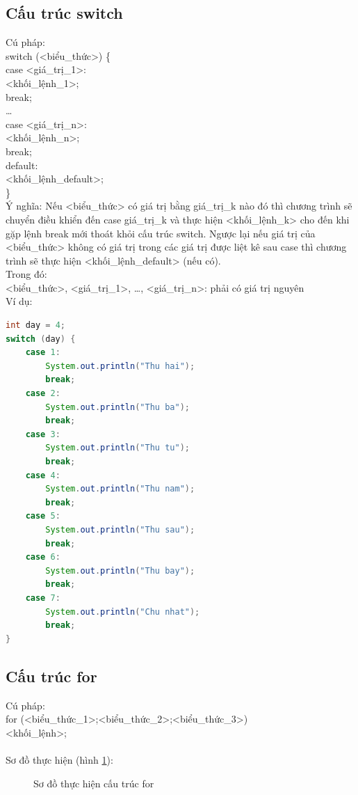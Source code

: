 \subsection{Cấu trúc switch}
\indent Cú pháp:\\
{\ttfamily
switch (<biểu\_thức>) \{\\
\indent case <giá\_trị\_1>:\\
\indent \indent <khối\_lệnh\_1>;\\
\indent \indent break;\\
\indent \indent …\\
\indent case <giá\_trị\_n>:\\
\indent \indent <khối\_lệnh\_n>;\\
\indent \indent break;\\
\indent default:\\
\indent \indent <khối\_lệnh\_default>;\\
\}}\\
\indent Ý nghĩa: Nếu {\ttfamily <biểu\_thức>} có giá trị bằng {\ttfamily giá\_trị\_k} nào đó thì chương trình sẽ chuyển điều khiển đến {\ttfamily case giá\_trị\_k} và thực hiện {\ttfamily <khối\_lệnh\_k>} cho đến khi gặp lệnh {\ttfamily break} mới thoát khỏi cấu trúc {\ttfamily switch}. Ngược lại nếu giá trị của {\ttfamily <biểu\_thức>} không có giá trị trong các giá trị được liệt kê sau {\ttfamily case} thì chương trình sẽ thực hiện {\ttfamily <khối\_lệnh\_default>} (nếu có).\\
\indent Trong đó:\\
{\ttfamily <biểu\_thức>, <giá\_trị\_1>, …, <giá\_trị\_n>}: phải có giá trị nguyên\\
\indent Ví dụ:
\begin{lstlisting}[escapechar=!,language=java]	
int day = 4;
switch (day) {
	case 1:
		System.out.println("Thu hai");
		break;
	case 2:
		System.out.println("Thu ba");
		break;
	case 3:
		System.out.println("Thu tu");
		break;
	case 4:
		System.out.println("Thu nam");
		break;
	case 5:
		System.out.println("Thu sau");
		break;
	case 6:
		System.out.println("Thu bay");
		break;
	case 7:
		System.out.println("Chu nhat");
		break;
}
\end{lstlisting}
\subsection{Cấu trúc for}
\indent Cú pháp:\\
{\ttfamily 
for (<biểu\_thức\_1>;<biểu\_thức\_2>;<biểu\_thức\_3>) {\\
\indent <khối\_lệnh>;\\
}}\\
\indent Sơ đồ thực hiện (hình \ref{hinh14}):\\
\begin{figure}[!ht]
\centering

\caption{Sơ đồ thực hiện cấu trúc for}\label{hinh14} 
\end{figure}

